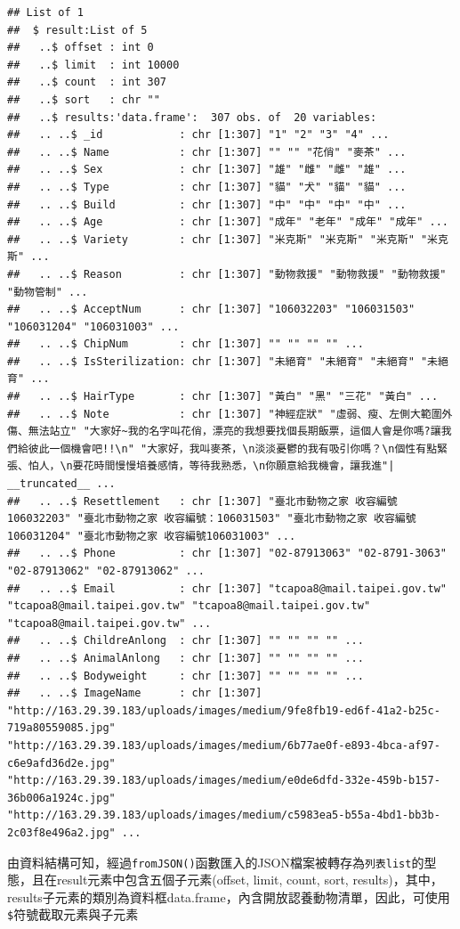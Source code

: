 \documentclass[]{book}
\theoremstyle{definition}
\theoremstyle{definition}
\theoremstyle{remark}
\begin{document}
\begin{verbatim}
## List of 1
##  $ result:List of 5
##   ..$ offset : int 0
##   ..$ limit  : int 10000
##   ..$ count  : int 307
##   ..$ sort   : chr ""
##   ..$ results:'data.frame':  307 obs. of  20 variables:
##   .. ..$ _id            : chr [1:307] "1" "2" "3" "4" ...
##   .. ..$ Name           : chr [1:307] "" "" "花俏" "麥茶" ...
##   .. ..$ Sex            : chr [1:307] "雄" "雌" "雌" "雄" ...
##   .. ..$ Type           : chr [1:307] "貓" "犬" "貓" "貓" ...
##   .. ..$ Build          : chr [1:307] "中" "中" "中" "中" ...
##   .. ..$ Age            : chr [1:307] "成年" "老年" "成年" "成年" ...
##   .. ..$ Variety        : chr [1:307] "米克斯" "米克斯" "米克斯" "米克斯" ...
##   .. ..$ Reason         : chr [1:307] "動物救援" "動物救援" "動物救援" "動物管制" ...
##   .. ..$ AcceptNum      : chr [1:307] "106032203" "106031503" "106031204" "106031003" ...
##   .. ..$ ChipNum        : chr [1:307] "" "" "" "" ...
##   .. ..$ IsSterilization: chr [1:307] "未絕育" "未絕育" "未絕育" "未絕育" ...
##   .. ..$ HairType       : chr [1:307] "黃白" "黑" "三花" "黃白" ...
##   .. ..$ Note           : chr [1:307] "神經症狀" "虛弱、瘦、左側大範圍外傷、無法站立" "大家好~我的名字叫花俏，漂亮的我想要找個長期飯票，這個人會是你嗎?讓我們給彼此一個機會吧!!\n" "大家好，我叫麥茶，\n淡淡憂鬱的我有吸引你嗎？\n個性有點緊張、怕人，\n要花時間慢慢培養感情，等待我熟悉，\n你願意給我機會，讓我進"| __truncated__ ...
##   .. ..$ Resettlement   : chr [1:307] "臺北市動物之家 收容編號106032203" "臺北市動物之家 收容編號：106031503" "臺北市動物之家 收容編號106031204" "臺北市動物之家 收容編號106031003" ...
##   .. ..$ Phone          : chr [1:307] "02-87913063" "02-8791-3063" "02-87913062" "02-87913062" ...
##   .. ..$ Email          : chr [1:307] "tcapoa8@mail.taipei.gov.tw" "tcapoa8@mail.taipei.gov.tw" "tcapoa8@mail.taipei.gov.tw" "tcapoa8@mail.taipei.gov.tw" ...
##   .. ..$ ChildreAnlong  : chr [1:307] "" "" "" "" ...
##   .. ..$ AnimalAnlong   : chr [1:307] "" "" "" "" ...
##   .. ..$ Bodyweight     : chr [1:307] "" "" "" "" ...
##   .. ..$ ImageName      : chr [1:307] "http://163.29.39.183/uploads/images/medium/9fe8fb19-ed6f-41a2-b25c-719a80559085.jpg" "http://163.29.39.183/uploads/images/medium/6b77ae0f-e893-4bca-af97-c6e9afd36d2e.jpg" "http://163.29.39.183/uploads/images/medium/e0de6dfd-332e-459b-b157-36b006a1924c.jpg" "http://163.29.39.183/uploads/images/medium/c5983ea5-b55a-4bd1-bb3b-2c03f8e496a2.jpg" ...
\end{verbatim}

由資料結構可知，經過\texttt{fromJSON()}函數匯入的JSON檔案被轉存為\texttt{列表list}的型態，且在result元素中包含五個子元素(offset,
limit, count, sort,
results)，其中，results子元素的類別為資料框data.frame，內含開放認養動物清單，因此，可使用\texttt{\$}符號截取元素與子元素
\end{document}
